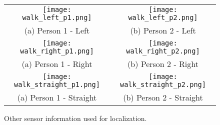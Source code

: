 \begin{figure}[!htb]
\centering
\begin{tabular}{@{}c@{} @{}c@{}}
\vspace{-5pt}
\texttt{[image: walk\_left\_p1.png]} & \texttt{[image: walk\_left\_p2.png]}\\[\abovecaptionskip]
\small(a) Person 1 - Left & \small (b) Person 2 - Left\\
\texttt{[image: walk\_right\_p1.png]} & \texttt{[image: walk\_right\_p2.png]}\\[\abovecaptionskip]
\small(a) Person 1 - Right & \small (b) Person 2 - Right\\
\texttt{[image: walk\_straight\_p1.png]} & \texttt{[image: walk\_straight\_p2.png]}\\[\abovecaptionskip]
\small(a) Person 1 - Straight & \small (b) Person 2 - Straight\\
\end{tabular}
\caption{Other sensor information used for localization.}
\label{tab:sensor}
\end{figure}
